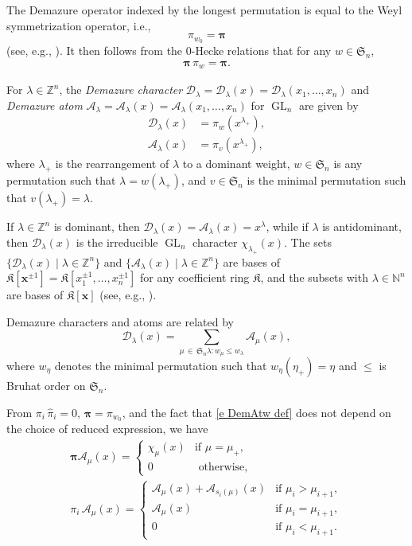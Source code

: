 \documentclass[12pt]{amsart}
\theoremstyle{definition}
\theoremstyle{remark}
\newcommand{\NN}{{\mathbb N}}
\newcommand{\ZZ}{{\mathbb Z}}
\newcommand{\xx}{{\mathbf x}}
\newcommand{\pibold}{{\boldsymbol \pi }}
\newcommand{\Weyl}{\pibold }
\newcommand{\Dem}{\pi }
\newcommand{\DemAt}{\widehat{\pi}}
\newcommand{\Kfrak}{{\mathfrak K}}
\newcommand{\Sfrak}{{\mathfrak S}}
\newcommand{\Acal}{{\mathcal A}}
\newcommand{\Dcal}{{\mathcal D}}
\DeclareMathOperator{\GL}{GL}
\begin{document}
The Demazure operator indexed by the longest permutation is equal to
the Weyl symmetrization operator, i.e.,
\begin{equation}
\Dem_{w_0} = \Weyl
\end{equation}
(see, e.g., \cite[eq.~(1.5.2)]{Lascoux12}).  It then follows from the
0-Hecke relations that for any $w \in \Sfrak_n$,
\begin{align}
\Weyl \, \Dem_w = \Weyl.
\end{align}


For $\lambda \in \ZZ^n$, the \emph{Demazure character} $\Dcal_\lambda
= \Dcal_\lambda(x) = \Dcal_\lambda(x_1,\dots, x_n)$ and \emph{Demazure
atom} $\Acal_\lambda = \Acal_\lambda(x) = \Acal_\lambda(x_1,\dots,
x_n)$ for $\GL_n$ are given by
\begin{align}\label{e:D-and-A}
\Dcal _{\lambda}(x) &= \Dem_{w}(x^{\lambda_{+}}),\\
\Acal_\lambda(x) &= \DemAt_{v} (x^{\lambda_+}),
\end{align}
where $\lambda_+$ is the rearrangement of $\lambda$ to a dominant
weight, $w \in \Sfrak_n$ is any permutation such that $\lambda
=w(\lambda_{+})$, and $v \in \Sfrak_n$ is the minimal permutation such
that $v(\lambda_+) = \lambda$.

If $\lambda \in \ZZ^n$ is dominant, then $\Dcal_\lambda(x) =
\Acal_\lambda(x) = x^\lambda$, while if $\lambda$ is antidominant,
then $\Dcal_\lambda(x)$ is the irreducible $\GL _{n}$ character $\chi
_{\lambda_+ }(x)$.  The sets $\{\Dcal _{\lambda }(x) \mid \lambda \in
\ZZ ^{n} \}$ and $\{\Acal_{\lambda }(x) \mid \lambda \in \ZZ ^{n} \}$
are bases of $\Kfrak [\xx ^{\pm 1}] = \Kfrak [x_{1}^{\pm 1}, \ldots,
x_{n}^{\pm 1}]$ for any coefficient ring $\Kfrak $, and the subsets
with $\lambda \in \NN^{n}$ are bases of $\Kfrak [\xx ]$ (see, e.g.,
\cite[Corollary 7]{RS}).

Demazure characters and atoms are related by
\begin{equation}\label{e:dem to atom}
\Dcal_{\lambda}(x) = \sum_{\mu \, \in \,
\Sfrak_n \lambda \colon  w_\mu \le w_\lambda} \Acal_\mu(x),
\end{equation}
where $w_\eta$ denotes the minimal permutation such that
$w_\eta(\eta_+)= \eta$ and $\le$ is Bruhat order on $\Sfrak_n$.

From $\Dem_i \, \DemAt_i = 0$, $\Weyl = \Dem_{w_0}$, and the fact that
\eqref{e DemAtw def} does not depend on the choice of reduced
expression, we have
\begin{gather}\label{e:for atom pos 1}
\Weyl \Acal _{\mu }(x) =
\begin{cases}
\chi _{\mu }(x) & \text{if $\mu =\mu _{+}$,} \\
0 & \text{ otherwise},
\end{cases}
\\[1ex]
\label{e:for atom pos 2}
\Dem _{i}\, \Acal _{\mu }(x) = \begin{cases}
\Acal _{\mu }(x)+\Acal _{s_{i}(\mu )}(x) &
	\text{if $\mu _{i}>\mu _{i+1}$},\\
\Acal _{\mu }(x) &	    \text{if $\mu _{i} = \mu _{i+1}$},\\
0& \text{if $\mu _{i}<\mu _{i+1}$}.
\end{cases}
\end{gather}
\end{document}
